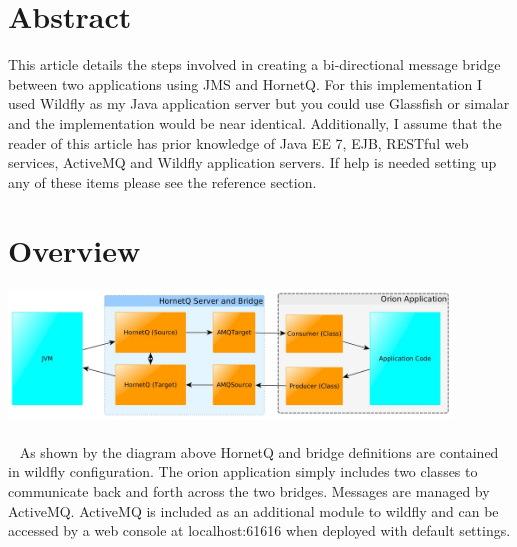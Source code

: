 \documentclass[
10pt, %
letterpaper, %
oneside, %
headinclude,footinclude, %
BCOR5mm, %
]{scrartcl}
\title{\normalfont\spacedallcaps{Bi-Directional JMS Bridge}} %
\author{\spacedlowsmallcaps{Michael Meding* , mmeding@outsmartinc.com}} %
\date{} %
\begin{document}
\maketitle %

\setcounter{tocdepth}{2} %

\tableofcontents %

\thispagestyle{empty} %

 
\section*{Abstract}
This article details the steps involved in creating a bi-directional message bridge between two applications using JMS and HornetQ. For this implementation I used Wildfly as my Java application server but you could use Glassfish or simalar and the implementation would be near identical. Additionally, I assume that the reader of this article has prior knowledge of Java EE 7, EJB, RESTful web services, ActiveMQ and Wildfly application servers. If help is needed setting up any of these items please see the reference section.



\section{Overview}


\includegraphics[width=11.75cm]{FlowchartPic} %
\paragraph{}~\newline
As shown by the diagram above HornetQ and bridge definitions are contained in wildfly configuration. The orion application simply includes two classes to communicate back and forth across the two bridges. Messages are managed by ActiveMQ. ActiveMQ is included as an additional module to wildfly and can be accessed by a web console at localhost:61616 when deployed with default settings.
\end{document}
